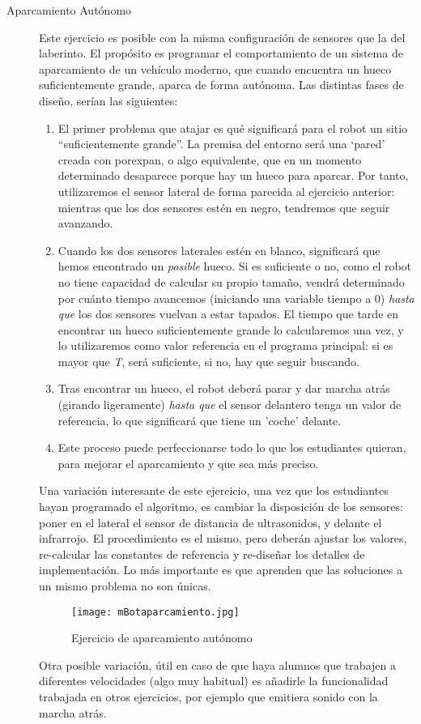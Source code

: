 \begin{description}
	\item [Aparcamiento Autónomo] \label{ej:aparcamiento}
	Este ejercicio es posible con la misma configuración de sensores que la del laberinto. El propósito es programar el comportamiento de un sistema de aparcamiento de un vehículo moderno, que cuando encuentra un hueco suficientemente grande, aparca de forma autónoma. Las distintas fases de diseño, serían las siguientes:
	\begin{enumerate}
		\item El primer problema que atajar es qué significará para el robot un sitio ``suficientemente grande''. La premisa del entorno será una `pared' creada con porexpan, o algo equivalente, que en un momento determinado desaparece porque hay un hueco para aparcar. Por tanto, utilizaremos el sensor lateral de forma parecida al ejercicio anterior: mientras que los dos sensores estén en negro, tendremos que seguir avanzando.
		\item Cuando los dos sensores laterales estén en blanco, significará que hemos encontrado un \textit{posible} hueco. Si es suficiente o no, como el robot no tiene capacidad de calcular su propio tamaño, vendrá determinado por cuánto tiempo avancemos (iniciando una variable tiempo a 0) \textit{hasta que} los dos sensores vuelvan a estar tapados. El tiempo que tarde en encontrar un hueco suficientemente grande lo calcularemos una vez, y lo utilizaremos como valor referencia en el programa principal: si es mayor que \textit{T}, será suficiente, si no, hay que seguir buscando.
		\item Tras encontrar un hueco, el robot deberá parar y dar marcha atrás (girando ligeramente) \textit{hasta que} el sensor delantero tenga un valor de referencia, lo que significará que tiene un 'coche' delante. 
		\item Este proceso puede perfeccionarse todo lo que los estudiantes quieran, para mejorar el aparcamiento y que sea más preciso.		
	\end{enumerate}
	Una variación interesante de este ejercicio, una vez que los estudiantes hayan programado el algoritmo, es cambiar la disposición de los sensores: poner en el lateral el sensor de distancia de ultrasonidos, y delante el infrarrojo. El procedimiento es el mismo, pero deberán ajustar los valores, re-calcular las constantes de referencia y re-diseñar los detalles de implementación. Lo más importante es que aprenden que las soluciones a un mismo problema no son únicas.
	\begin{figure}[H]
		\texttt{[image: mBotaparcamiento.jpg]}
		\centering
		\label{img:mBotaparcamiento}
		\caption{Ejercicio de aparcamiento autónomo}
	\end{figure}
	Otra posible variación, útil en caso de que haya alumnos que trabajen a diferentes velocidades (algo muy habitual) es añadirle la funcionalidad trabajada en otros ejercicios, por ejemplo que emitiera sonido con la marcha atrás.
\end{description}


